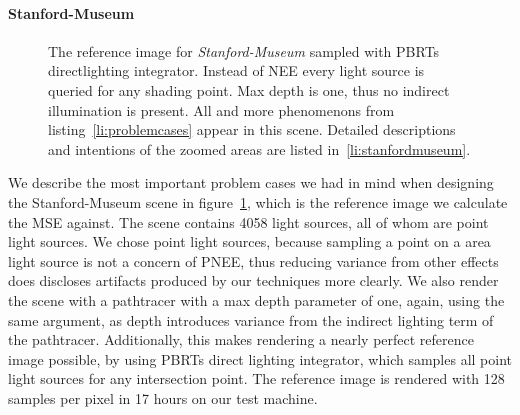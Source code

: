 \paragraph{Stanford-Museum}

\begin{figure}[ht]\centering

\caption{The reference image for \textit{Stanford-Museum} sampled with PBRTs directlighting integrator. Instead of NEE every light source is queried for any shading point. Max depth is one, thus no indirect illumination is present. All and more phenomenons from listing~\ref{li:problemcases} appear in this scene. Detailed descriptions and intentions of the zoomed areas are listed in~\ref{li:stanfordmuseum}.
}
\label{fig:stanfordmuseumref}
\end{figure}

We describe the most important problem cases we had in mind when designing the Stanford-Museum scene in figure~\ref{fig:stanfordmuseumref}, which is the reference image we calculate the MSE against. The scene contains 4058 light sources, all of whom are point light sources. We chose point light sources, because sampling a point on a area light source is not a concern of PNEE, thus reducing variance from other effects does discloses artifacts produced by our techniques more clearly. We also render the scene with a pathtracer with a max depth parameter of one, again, using the same argument, as depth introduces variance from the indirect lighting term of the pathtracer. Additionally, this makes rendering a nearly perfect reference image possible, by using PBRTs direct lighting integrator, which samples all point light sources for any intersection point. The reference image is rendered with 128 samples per pixel in 17 hours on our test machine. 

